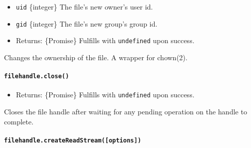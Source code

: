 \begin{itemize}
\tightlist
\item
  \texttt{uid} \{integer\} The file's new owner's user id.
\item
  \texttt{gid} \{integer\} The file's new group's group id.
\item
  Returns: \{Promise\} Fulfills with \texttt{undefined} upon success.
\end{itemize}

Changes the ownership of the file. A wrapper for chown(2).

\paragraph{\texorpdfstring{\texttt{filehandle.close()}}{filehandle.close()}}\label{filehandle.close}

\begin{itemize}
\tightlist
\item
  Returns: \{Promise\} Fulfills with \texttt{undefined} upon success.
\end{itemize}

Closes the file handle after waiting for any pending operation on the
handle to complete.

\begin{Shaded}
\begin{Highlighting}[]
 \OperatorTok{;}

\OperatorTok{;}
\NormalTok{ \{}
\OperatorTok{=}  \NormalTok{(}\OperatorTok{,} \NormalTok{)}\OperatorTok{;}
\NormalTok{\} }\NormalTok{ \{}
  \NormalTok{()}\OperatorTok{;}
\NormalTok{\}}
\end{Highlighting}
\end{Shaded}

\paragraph{\texorpdfstring{\texttt{filehandle.createReadStream({[}options{]})}}{filehandle.createReadStream({[}options{]})}}\label{filehandle.createreadstreamoptions}

